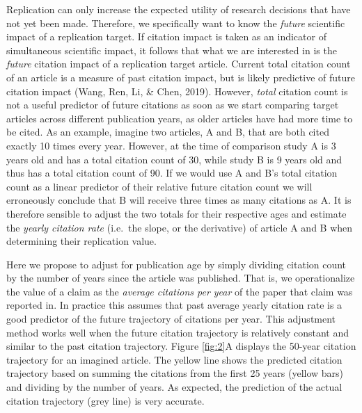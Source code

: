 \documentclass[
  english,
  jou,floatsintext]{apa6}
\begin{document}
Replication can only increase the expected utility of research decisions that have not yet been made. Therefore, we specifically want to know the \emph{future} scientific impact of a replication target. If citation impact is taken as an indicator of simultaneous scientific impact, it follows that what we are interested in is the \emph{future} citation impact of a replication target article. Current total citation count of an article is a measure of past citation impact, but is likely predictive of future citation impact (Wang, Ren, Li, \& Chen, 2019). However, \emph{total} citation count is not a useful predictor of future citations as soon as we start comparing target articles across different publication years, as older articles have had more time to be cited. As an example, imagine two articles, A and B, that are both cited exactly 10 times every year. However, at the time of comparison study A is 3 years old and has a total citation count of 30, while study B is 9 years old and thus has a total citation count of 90. If we would use A and B's total citation count as a linear predictor of their relative future citation count we will erroneously conclude that B will receive three times as many citations as A. It is therefore sensible to adjust the two totals for their respective ages and estimate the \emph{yearly citation rate} (i.e.~the slope, or the derivative) of article A and B when determining their replication value.

Here we propose to adjust for publication age by simply dividing citation count by the number of years since the article was published. That is, we operationalize the value of a claim as the \emph{average citations per year} of the paper that claim was reported in. In practice this assumes that past average yearly citation rate is a good predictor of the future trajectory of citations per year. This adjustment method works well when the future citation trajectory is relatively constant and similar to the past citation trajectory. Figure \ref{fig:2}A displays the 50-year citation trajectory for an imagined article. The yellow line shows the predicted citation trajectory based on summing the citations from the first 25 years (yellow bars) and dividing by the number of years. As expected, the prediction of the actual citation trajectory (grey line) is very accurate.
\end{document}
